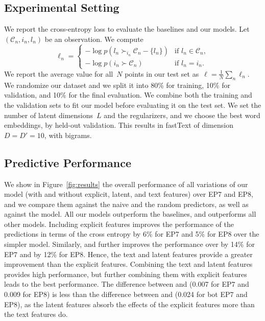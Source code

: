 \subsection{Experimental Setting}

We report the cross-entropy loss to evaluate the baselines and our models.
Let~$( \mathcal{C}_n, i_n, l_n )$ be an observation.
We compute
\begin{equation}
	\ell_n = \begin{cases}
		-\log p(l_n \succ_{i_n} \mathcal{C}_n - \{l_n\} ) & \text{if $l_n \in \mathcal{C}_n$}, \\
		-\log p(i_n \succ \mathcal{C}_n)                  & \text{if $l_n = i_n$}.
	\end{cases}
\end{equation}
We report the average value for all~$N$ points in our test set as~$\ell = \frac{1}{N} \sum_n \ell_n$.
We randomize our dataset and we split it into 80\% for training, 10\% for validation, and 10\% for the final evaluation.
We combine both the training and the validation sets to fit our model before evaluating it on the test set.
We set the number of latent dimensions~$L$ and the regularizers, and we choose the best word embeddings, by held-out validation.
This results in fastText of dimension~$D = D' = 10$, with bigrams.

\subsection{Predictive Performance}

We show in Figure~\ref{fig:results} the overall performance of all variations of our model (with and without explicit, latent, and text features) over EP7 and EP8, and we compare them against the naive and the random predictors, as well as against the \wow{} model.
All our models outperform the baselines, and  outperforms all other models.
Including explicit features improves the performance of the predictions in terms of the cross entropy by 6\% for EP7 and 5\% for EP8 over the simpler \wow{} model.
Similarly,  and  further improves the performance over \wow{} by 14\% for EP7 and by 12\% for EP8.
Hence, the text and latent features provide a greater improvement than the explicit features.
Combining the text and latent features provides high performance, but further combining them with explicit features leads to the best performance.
The difference between  and  (0.007 for EP7 and 0.009 for EP8) is less than the difference between  and  (0.024 for bot EP7 and EP8), as the latent features absorb the effects of the explicit features more than the text features do.

